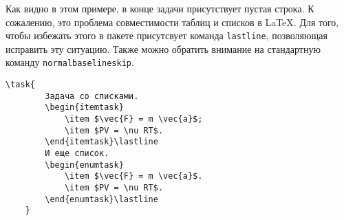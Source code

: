 \noindent
{}

\vspace{0.3cm}

Как видно в этом примере, в конце задачи присутствует пустая строка. К сожалению, это проблема
совместимости таблиц и списков в \LaTeX. Для того, чтобы избежать этого в пакете присутсвует команда
\texttt{lastline}, позволяющая исправить эту ситуацию. Также можно обратить внимание на стандартную
команду \texttt{normalbaselineskip}.

\begin{lstlisting}[gobble = 3]
    \task{
        Задача со списками.
        \begin{itemtask}
            \item $\vec{F} = m \vec{a}$;
            \item $PV = \nu RT$.
        \end{itemtask}\lastline
        И еще список.
        \begin{enumtask}
            \item $\vec{F} = m \vec{a}$.
            \item $PV = \nu RT$.
        \end{enumtask}\lastline
    }
\end{lstlisting}

\noindent
{}

